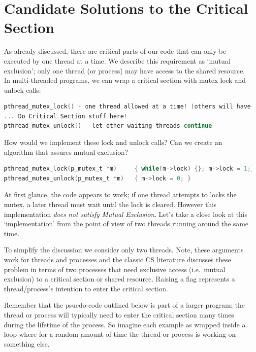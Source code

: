 \section{Candidate Solutions to the Critical Section}\label{candidate-solutions}

As already discussed, there are critical parts of our code that can only be executed by one thread at a time.
We describe this requirement as `mutual exclusion'; only one thread (or process) may have access to the shared resource.
In multi-threaded programs, we can wrap a critical section with mutex lock and unlock calls:

\begin{lstlisting}[language=C]
pthread_mutex_lock() - one thread allowed at a time! (others will have to wait here)
... Do Critical Section stuff here!
pthread_mutex_unlock() - let other waiting threads continue
\end{lstlisting}

How would we implement these lock and unlock calls?
Can we create an algorithm that assures mutual exclusion?

\begin{lstlisting}[language=C]
pthread_mutex_lock(p_mutex_t *m)     { while(m->lock) {}; m->lock = 1;}
pthread_mutex_unlock(p_mutex_t *m)   { m->lock = 0; }
\end{lstlisting}

At first glance, the code appears to work; if one thread attempts to locks the mutex, a later thread must wait until the lock is cleared. However this implementation \emph{does not satisfy Mutual Exclusion}. Let's take a close look at this `implementation' from the point of view of two threads running around the same time.


To simplify the discussion we consider only two threads. Note, these arguments work for threads and processes and the classic CS literature discusses these problem in terms of two processes that need exclusive access (i.e.~mutual exclusion) to a critical section or shared resource. Raising a flag represents a thread/process's intention to enter the critical section.

Remember that the psuedo-code outlined below is part of a larger program; the thread or process will typically need to enter the critical section many times during the lifetime of the process. So imagine each example as wrapped inside a loop where for a random amount of time the thread or process is working on something else.

